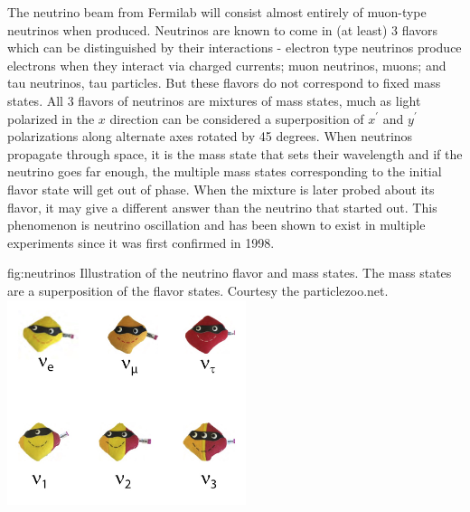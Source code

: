 \documentclass[../main-v1.tex]{subfiles}
\begin{document}
The neutrino beam from Fermilab will consist almost entirely of muon-type neutrinos when produced.  Neutrinos are known to come in (at least) 3 flavors which can be distinguished by their interactions - electron type neutrinos produce electrons when they interact via charged currents; muon neutrinos, muons; and tau neutrinos, tau particles.  But these flavors do not correspond to fixed mass states.  All 3 flavors of neutrinos are mixtures of mass states, much as  light polarized in the $x$ direction  can be considered a superposition of  $x^\prime$ and $y^\prime$ polarizations along  alternate axes rotated by 45 degrees.  When neutrinos propagate through space, it is the mass state that sets their wavelength and if the neutrino goes far enough, the multiple mass states  corresponding to the initial flavor state will get out of phase.  When the mixture is later probed about its flavor, it  may give a different answer than the neutrino that started out. This phenomenon is neutrino oscillation and has been shown to exist in multiple experiments since it was first confirmed in 1998\cite{Kajita2006}.


\begin{dunefigure}
{fig:neutrinos}
{Illustration of the neutrino flavor and mass states.  The mass states are a superposition of the flavor states.  Courtesy the particlezoo.net.}
\includegraphics[height=6cm]{graphics/IntroFigures/Fig_01_neutrinos.jpg}
\end{dunefigure}
\end{document}
